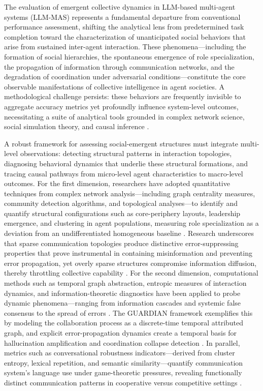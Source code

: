 \documentclass[11pt,a4paper]{article}
\begin{document}
The evaluation of emergent collective dynamics in LLM-based multi-agent systems (LLM-MAS) represents a fundamental departure from conventional performance assessment, shifting the analytical lens from predetermined task completion toward the characterization of unanticipated social behaviors that arise from sustained inter-agent interaction. These phenomena---including the formation of social hierarchies, the spontaneous emergence of role specialization, the propagation of information through communication networks, and the degradation of coordination under adversarial conditions---constitute the core observable manifestations of collective intelligence in agent societies. A methodological challenge persists: these behaviors are frequently invisible to aggregate accuracy metrics yet profoundly influence system-level outcomes, necessitating a suite of analytical tools grounded in complex network science, social simulation theory, and causal inference \cite{arxiv:2505.21298v4,arxiv:2502.14321v3}.

A robust framework for assessing social-emergent structures must integrate multi-level observations: detecting structural patterns in interaction topologies, diagnosing behavioral dynamics that underlie these structural formations, and tracing causal pathways from micro-level agent characteristics to macro-level outcomes. For the first dimension, researchers have adopted quantitative techniques from complex network analysis---including graph centrality measures, community detection algorithms, and topological analyses---to identify and quantify structural configurations such as core-periphery layouts, leadership emergence, and clustering in agent populations, measuring role specialization as a deviation from an undifferentiated homogeneous baseline \cite{arxiv:2505.23352v1,arxiv:2604.17148v1}. Research underscores that sparse communication topologies produce distinctive error-suppressing properties that prove instrumental in containing misinformation and preventing error propagation, yet overly sparse structures compromise information diffusion, thereby throttling collective capability \cite{arxiv:2505.23352v1}. For the second dimension, computational methods such as temporal graph abstraction, entropic measures of interaction dynamics, and information-theoretic diagnostics have been applied to probe dynamic phenomena---ranging from information cascades and systemic false consensus to the spread of errors \cite{arxiv:2603.04474v2,arxiv:2505.19234v2}. The GUARDIAN framework exemplifies this by modeling the collaboration process as a discrete-time temporal attributed graph, and explicit error-propagation dynamics create a temporal basis for hallucination amplification and coordination collapse detection \cite{arxiv:2505.19234v2}. In parallel, metrics such as conversational robustness indicators---derived from cluster entropy, lexical repetition, and semantic similarity---quantify communication system's language use under game-theoretic pressures, revealing functionally distinct communication patterns in cooperative versus competitive settings \cite{arxiv:2508.11915v2}.
\end{document}
